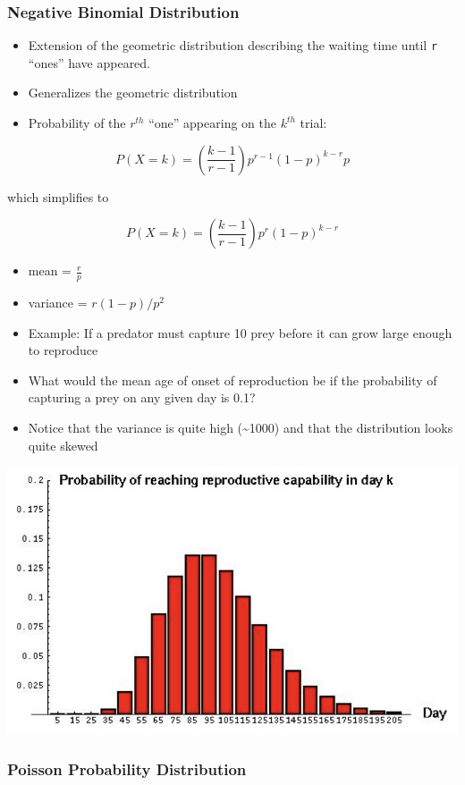 \documentclass[]{book}
\providecommand{\tightlist}{%
  \setlength{\itemsep}{0pt}\setlength{\parskip}{0pt}}
\begin{document}
\hypertarget{negative-binomial-distribution}{%
\subsubsection{\texorpdfstring{\textbf{Negative Binomial Distribution}}{Negative Binomial Distribution}}\label{negative-binomial-distribution}}

\begin{itemize}
\tightlist
\item
  Extension of the geometric distribution describing the waiting time until \texttt{r} ``ones'' have appeared.
\item
  Generalizes the geometric distribution
\item
  Probability of the \(r^{th}\) ``one'' appearing on the \(k^{th}\) trial:
\end{itemize}

\[P(X=k)=(\frac{k-1}{r-1})p^{r-1}(1-p)^{k-r}p\]

which simplifies to

\[P(X=k)=(\frac{k-1}{r-1})p^{r}(1-p)^{k-r}\]

\begin{itemize}
\item
  mean = \(\frac{r}{p}\)
\item
  variance = \(r(1-p)/p^2\)
\item
  Example: If a predator must capture 10 prey before it can grow large enough to reproduce
\item
  What would the mean age of onset of reproduction be if the probability of capturing a prey on any given day is 0.1?
\item
  Notice that the variance is quite high (\textasciitilde{}1000) and that the distribution looks quite skewed
\end{itemize}

\begin{center}\includegraphics[width=0.5\linewidth]{images/prob.018} \end{center}

\hypertarget{poisson-probability-distribution}{%
\subsubsection{\texorpdfstring{\textbf{Poisson Probability Distribution}}{Poisson Probability Distribution}}\label{poisson-probability-distribution}}
\end{document}
